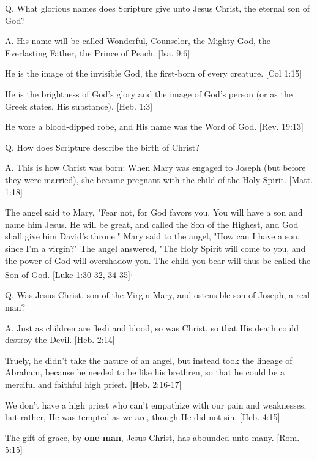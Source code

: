 \documentclass[../main.tex]{subfiles}
\begin{document}
	Q. What glorious names does Scripture give unto Jesus Christ, the eternal son of God?
	
	A. His name will be called Wonderful, Counselor, the Mighty God, the Everlasting Father, the Prince of Peach. [Isa. 9:6]
	
	He is the image of the invisible God, the first-born of every creature. [Col 1:15]
	
	He is the brightness of God's glory and the image of God's person (or as the Greek states, His substance). [Heb. 1:3]
	
	He wore a blood-dipped robe, and His name was the Word of God. [Rev. 19:13]
	
	Q. How does Scripture describe the birth of Christ?
	
	A. This is how Christ was born: When Mary was engaged to Joseph (but before they were married), she became pregnant with the child of the Holy Spirit. [Matt. 1:18]
	
	The angel said to Mary, "Fear not, for God favors you. You will have a son and name him Jesus. He will be great, and called the Son of the Highest, and God shall give him David's throne." Mary said to the angel, "How can I have a son, since I'm a virgin?" The angel answered, "The Holy Spirit will come to you, and the power of God will overshadow you. The child you bear will thus be called the Son of God. [Luke 1:30-32, 34-35]\textsuperscript{,}
	
	Q. Was Jesus Christ, son of the Virgin Mary, and ostensible son of Joseph, a real man?
	
A. Just as children are flesh and blood, so was Christ, so that His death could destroy the Devil. [Heb. 2:14]

Truely, he didn't take the nature of an angel, but instead took the lineage of Abraham, because he needed to be like his brethren, so that he could be a merciful and faithful high priest. [Heb. 2:16-17]

We don't have a high priest who can't empathize with our pain and weaknesses, but rather, He was tempted as we are, though He did not sin. [Heb. 4:15]

The gift of grace, by \textbf{one man}, Jesus Christ, has abounded unto many. [Rom. 5:15]
\end{document}

